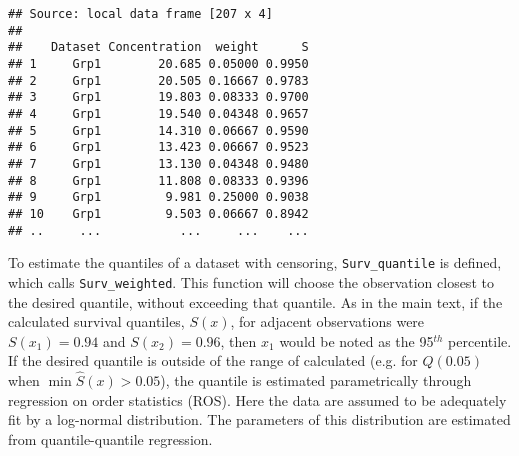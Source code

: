 \begin{verbatim}
## Source: local data frame [207 x 4]
## 
##    Dataset Concentration  weight      S
## 1     Grp1        20.685 0.05000 0.9950
## 2     Grp1        20.505 0.16667 0.9783
## 3     Grp1        19.803 0.08333 0.9700
## 4     Grp1        19.540 0.04348 0.9657
## 5     Grp1        14.310 0.06667 0.9590
## 6     Grp1        13.423 0.06667 0.9523
## 7     Grp1        13.130 0.04348 0.9480
## 8     Grp1        11.808 0.08333 0.9396
## 9     Grp1         9.981 0.25000 0.9038
## 10    Grp1         9.503 0.06667 0.8942
## ..     ...           ...     ...    ...
\end{verbatim}

To estimate the quantiles of a dataset with censoring, \texttt{Surv\_quantile} is defined, which calls \texttt{Surv\_weighted}.
This function will choose the observation closest to the desired quantile, without exceeding that quantile.
As in the main text, if the calculated survival quantiles, $S(x)$, for adjacent observations were $S(x_1)=0.94$ and $S(x_2)=0.96$, then $x_1$ would be noted as the 95$^{th}$ percentile.
If the desired quantile is outside of the range of calculated  (e.g. for $Q(0.05)$ when $\min \widehat{S}(x) > 0.05$), the quantile is estimated parametrically through regression on order statistics (ROS).
Here the data are assumed to be adequately fit by a log-normal distribution.
The parameters of this distribution are estimated from quantile-quantile regression.

